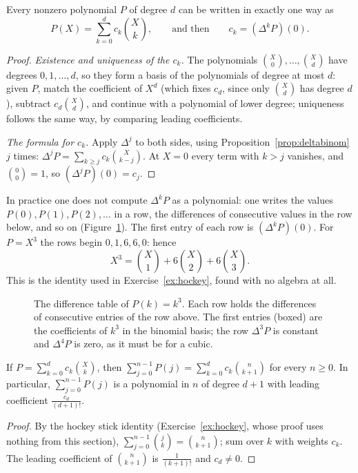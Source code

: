 \begin{theorem}\label{thm:newton}
Every nonzero polynomial $P$ of degree $d$ can be written in exactly one way as
\[
P(X)=\sum_{k=0}^dc_k\binom Xk,\qquad\text{and then}\qquad c_k=(\Delta^kP)(0).
\]
\end{theorem}
\begin{proof}
\emph{Existence and uniqueness of the $c_k$.} The polynomials $\binom X0,\dots,\binom Xd$ have degrees $0,1,\dots,d$, so they form a basis of the
polynomials of degree at most $d$: given $P$, match the coefficient of $X^d$ (which fixes $c_d$, since only $\binom Xd$ has degree $d$), subtract
$c_d\binom Xd$, and continue with a polynomial of lower degree; uniqueness follows the same way, by comparing leading coefficients.

\emph{The formula for $c_k$.} Apply $\Delta^j$ to both sides, using Proposition~\ref{prop:deltabinom} $j$ times: $\Delta^jP=\sum_{k\ge j}c_k\binom X{k-j}$.
At $X=0$ every term with $k>j$ vanishes, and $\binom00=1$, so $(\Delta^jP)(0)=c_j$.
\end{proof}

In practice one does not compute $\Delta^kP$ as a polynomial: one writes the values $P(0),P(1),P(2),\dots$ in a row, the differences of consecutive
values in the row below, and so on (Figure~\ref{fig:differences}). The first entry of each row is $(\Delta^kP)(0)$. For $P=X^3$ the rows begin
$0,1,6,6,0$: hence
\[
X^3=\binom X1+6\binom X2+6\binom X3.
\]
This is the identity used in Exercise~\ref{ex:hockey}, found with no algebra at all.

\begin{figure}[ht]
\centering
{}
\caption{The difference table of $P(k)=k^3$. Each row holds the differences of consecutive entries of the row above. The first entries (boxed) are the coefficients of $k^3$ in the binomial basis; the row $\Delta^3P$ is constant and $\Delta^4P$ is zero, as it must be for a cubic.}
\label{fig:differences}
\end{figure}

\begin{corollary}\label{cor:sumpoly}
If $P=\sum_{k=0}^dc_k\binom Xk$, then $\displaystyle\sum_{j=0}^{n-1}P(j)=\sum_{k=0}^dc_k\binom n{k+1}$ for every $n\ge0$.
In particular, $\sum_{j=0}^{n-1}P(j)$ is a polynomial in $n$ of degree $d+1$ with leading coefficient $\frac{c_d}{(d+1)!}$.
\end{corollary}
\begin{proof}
By the hockey stick identity (Exercise~\ref{ex:hockey}, whose proof uses nothing from this section), $\sum_{j=0}^{n-1}\binom jk=\binom n{k+1}$; sum over $k$ with weights $c_k$. The leading
coefficient of $\binom n{k+1}$ is $\frac1{(k+1)!}$ and $c_d\ne0$.
\end{proof}

